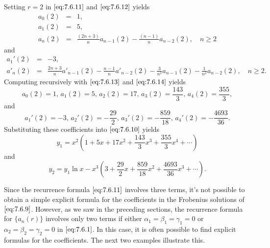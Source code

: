 \documentclass{ximera}
\begin{document}
\begin{example}
\begin{explanation}
Setting $r=2$ in $\eqref{eq:7.6.11}$ and $\eqref{eq:7.6.12}$ yields
\begin{equation} \label{eq:7.6.13}
\begin{array}{ccl}
a_0(2)&=&1,\\
a_1(2)&=&5,\\
a_n(2)&=&\frac{(2n+3)}{n}
a_{n-1}(2)-\frac{(n-1)}{n}a_{n-2}(2),\quad n\geq 2
\end{array}
\end{equation}
and
\begin{equation} \label{eq:7.6.14}
\begin{array}{ccl}
a_1'(2)&=&-3,\\
a'_n(2)&=&\frac{2n+3}{n}a'_{n-1}(2)-\frac{n-1}{n}a'_{n-2}(2)
-\frac{3}{n^2}a_{n-1}(2)-\frac{1}{n^2}a_{n-2}(2),\quad n\geq 2.
\end{array}
\end{equation}
Computing recursively with  $\eqref{eq:7.6.13}$ and $\eqref{eq:7.6.14}$
yields
$$
a_0(2)=1,\,a_1(2)=5,\,a_2(2)=17,\,a_3(2)=\frac{143}{3},\,a_4(2)=\frac{355}{3},
$$
and
$$
a_1'(2)=-3,\,a_2'(2)=-\frac{29}{2},\,a_3'(2)=-\frac{859}{18},
\,a_4'(2)=-\frac{4693}{36}.
$$
Substituting these coefficients into $\eqref{eq:7.6.10}$ yields
$$
y_1=x^2\left(1+5x+17x^2+\frac{143}{3}x^3
+\frac{355}{3}x^4+\cdots\right)
$$
and
$$
y_2=y_1 \ln x
-x^3\left(3+\frac{29}{2}x+\frac{859}{18}x^2+\frac{4693}{36}x^3
+\cdots\right).
$$
\end{explanation}
\end{example}

Since the recurrence formula $\eqref{eq:7.6.11}$ involves three terms, it's
not possible to obtain a simple explicit formula for the coefficients in the Frobenius solutions of $\eqref{eq:7.6.9}$. However, as we saw in the
preceding sections, the recurrence formula for $\{a_n(r)\}$ involves
only two terms if either $\alpha_1=\beta_1=\gamma_1=0$ or
$\alpha_2=\beta_2=\gamma_2=0$ in $\eqref{eq:7.6.1}$. In this case, it is often possible to find explicit formulas for the coefficients. The next two
examples illustrate this.
\end{document}
